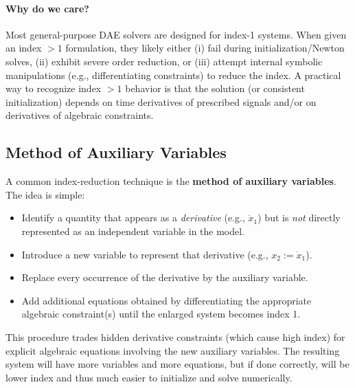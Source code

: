 \paragraph*{Why do we care?}
Most general-purpose DAE solvers are designed for index-1 systems. When given an index $>1$ formulation, they likely either (i) fail during initialization/Newton solves, (ii) exhibit severe order reduction, or (iii) attempt internal symbolic manipulations (e.g., differentiating constraints) to reduce the index. A practical way to recognize index $>1$ behavior is that the solution (or consistent initialization) depends on time derivatives of prescribed signals and/or on derivatives of algebraic constraints.

\subsection{Method of Auxiliary Variables}

A common index-reduction technique is the \textbf{method of auxiliary variables}. The idea is simple:

\begin{itemize}
    \item Identify a quantity that appears as a \emph{derivative} (e.g., $\dot x_1$) but is \emph{not} directly represented as an independent variable in the model.
    \item Introduce a new variable to represent that derivative (e.g., $x_2 := \dot x_1$).
    \item Replace every occurrence of the derivative by the auxiliary variable.
    \item Add additional equations obtained by differentiating the appropriate algebraic constraint(s) until the enlarged system becomes index 1.
\end{itemize}

This procedure trades hidden derivative constraints (which cause high index) for explicit algebraic equations involving the new auxiliary variables. The resulting system will have more variables and more equations, but if done correctly, will be lower index and thus much easier to initialize and solve numerically.

